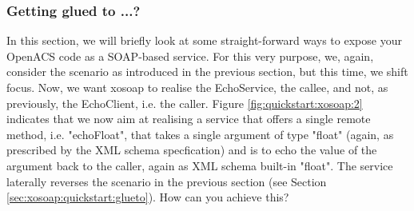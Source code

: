   \subsubsection{Getting glued to ...?}
  In this section, we will briefly look at some straight-forward ways
  to expose your OpenACS code as a SOAP-based service. For this very
  purpose, we, again, consider the scenario as introduced in the
  previous section, but this time, we shift focus. Now, we want xosoap
  to realise the EchoService, the callee, and not, as previously, the
  EchoClient, i.e. the caller. Figure \ref{fig:quickstart:xosoap:2}
  indicates that we now aim at realising a service that offers a single
  remote method, i.e. "echoFloat", that takes a single argument of type
  "float" (again, as prescribed by the XML schema specfication) and is
  to echo the value of the argument back to the caller, again as XML
  schema built-in "float". The service laterally reverses the scenario
  in the previous section (see Section
  \ref{sec:xosoap:quickstart:glueto}). How can you achieve this?
  
